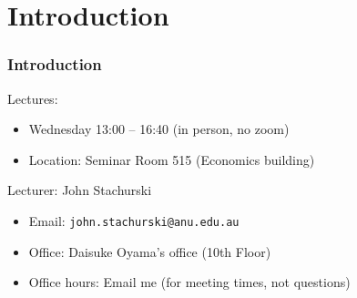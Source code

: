 


\subtitle{Lecture 1}

\author{John Stachurski}

\date{June -- July 2022}




\begin{frame}
  \titlepage
\end{frame}


\section{Introduction}


\begin{frame}
    \frametitle{Introduction}

    Lectures:

    \begin{itemize}
        \item Wednesday 13:00 -- 16:40  (in person, no zoom)
            \vspace{0.3em}
        \item Location: Seminar Room 515 (Economics building)
            \vspace{0.3em}
    \end{itemize}

            \vspace{0.3em}
            \vspace{0.3em}
    Lecturer: John Stachurski

    \begin{itemize}
        \item Email: \texttt{john.stachurski@anu.edu.au}
            \vspace{0.3em}
        \item Office: Daisuke Oyama's office (10th Floor)
            \vspace{0.3em}
        \item Office hours: Email me (for meeting times, not questions)
            \vspace{0.3em}
    \end{itemize}

\end{frame}




